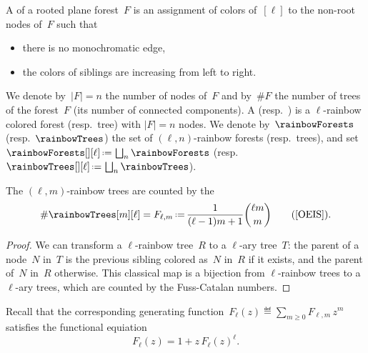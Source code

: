 \begin{definition}
\label{def:rainbowForest}
A  of a rooted plane forest~$F$ is an assignment of colors of~$[\ell]$ to the non-root nodes of~$F$ such that
\begin{itemize}
\item there is no monochromatic edge,
\item the colors of siblings are increasing from left to right.
\end{itemize}
We denote by~$|F| = n$ the number of nodes of~$F$ and by~$\#F$ the number of trees of the forest~$F$ (\ie its number of connected components).
A  (resp.~) is a $\ell$-rainbow colored forest (resp.~tree) with $|F| = n$ nodes.
We denote by~$\rainbowForests$ (resp.~$\rainbowTrees$) the set of $(\ell,n)$-rainbow forests (resp.~trees), and set~$\rainbowForests[][\ell] \eqdef \bigsqcup_n \rainbowForests$ (resp.~$\rainbowTrees[][\ell] \eqdef \bigsqcup_n \rainbowTrees$).
\end{definition}

\begin{lemma}
\label{lem:FussCatalan}
The $(\ell,m)$-rainbow trees are counted by the 
\[
\# \rainbowTrees[m][\ell] = F_{\ell,m} \eqdef \frac{1}{(\ell-1)m+1} \binom{\ell m}{m} \qquad \text{(\OEIS{A062993})}.
\]
\end{lemma}

\begin{proof}
We can transform a $\ell$-rainbow tree~$R$ to a $\ell$-ary tree~$T$: the parent of a node~$N$ in~$T$ is the previous sibling colored as~$N$ in~$R$ if it exists, and the parent of~$N$ in~$R$ otherwise.
This classical map is a bijection from $\ell$-rainbow trees to a $\ell$-ary trees, which are counted by the Fuss-Catalan numbers.
\end{proof}

\begin{remark}
\label{rem:functionalEquationFussCatalan}
Recall that the corresponding generating function~$F_\ell(z) \eqdef \sum_{m \ge 0} F_{\ell,m} \, z^m$ satisfies the functional equiation
\[
F_\ell(z) = 1 + z \, F_\ell(z)^\ell.
\]
\end{remark}


